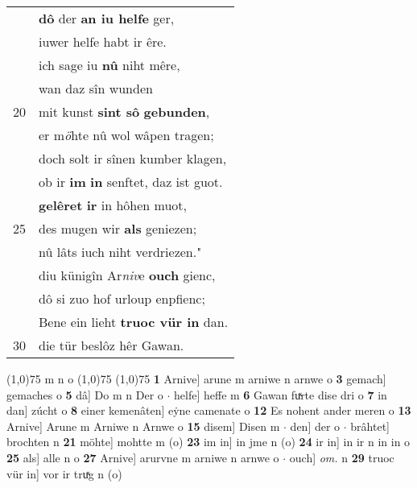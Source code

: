 \documentclass[8pt,a4paper,notitlepage]{article}
\begin{document}
\begin{table}[ht]
\begin{minipage}[t]{0.5\linewidth}
\begin{tabular}{rl}
 & \textbf{dô} der \textbf{an iu helfe} ger,\\ 
 & iuwer helfe habt ir êre.\\ 
 & ich sage iu \textbf{nû} niht mêre,\\ 
 & wan daz sîn wunden\\ 
20 & mit kunst \textbf{sint sô} \textbf{gebunden},\\ 
 & er m\textit{ö}hte nû wol wâpen tragen;\\ 
 & doch solt ir sînen kumber klagen,\\ 
 & ob ir \textbf{im} \textbf{in} senftet, daz ist guot.\\ 
 & \textbf{gelêret} \textbf{ir} in hôhen muot,\\ 
25 & des mugen wir \textbf{als} geniezen;\\ 
 & nû lâts iuch niht verdriezen."\\ 
 & diu künigîn Ar\textit{niv}e \textbf{ouch} gienc,\\ 
 & dô si zuo hof urloup enpfienc;\\ 
 & Bene ein lieht \textbf{truoc vür in} dan.\\ 
30 & die tür beslôz hêr Gawan.\\ 
\end{tabular}
\scriptsize
\line(1,0){75} \newline
m n o \newline
\line(1,0){75} \newline
\newline
\line(1,0){75} \newline
\textbf{1} Arnive] arune m arniwe n arnwe o \textbf{3} gemach] gemaches o \textbf{5} dâ] Do m n Der o  $\cdot$ helfe] heffe m \textbf{6} Gawan fuͯrte dise dri o \textbf{7} in dan] zúcht o \textbf{8} einer kemenâten] eẏne camenate o \textbf{12} Es nohent ander meren o \textbf{13} Arnive] Arune m Arniwe n Arnwe o \textbf{15} disem] Disen m  $\cdot$ den] der o  $\cdot$ brâhtet] brochten n \textbf{21} möhte] mohtte m (o) \textbf{23} im in] in jme n (o) \textbf{24} ir in] in ir n in in o \textbf{25} als] alle n o \textbf{27} Arnive] arurvne m arniwe n arnwe o  $\cdot$ ouch] \textit{om.} n \textbf{29} truoc vür in] vor ir truͯg n (o) \newline
\end{minipage}
\end{table}
\newpage
\end{document}
